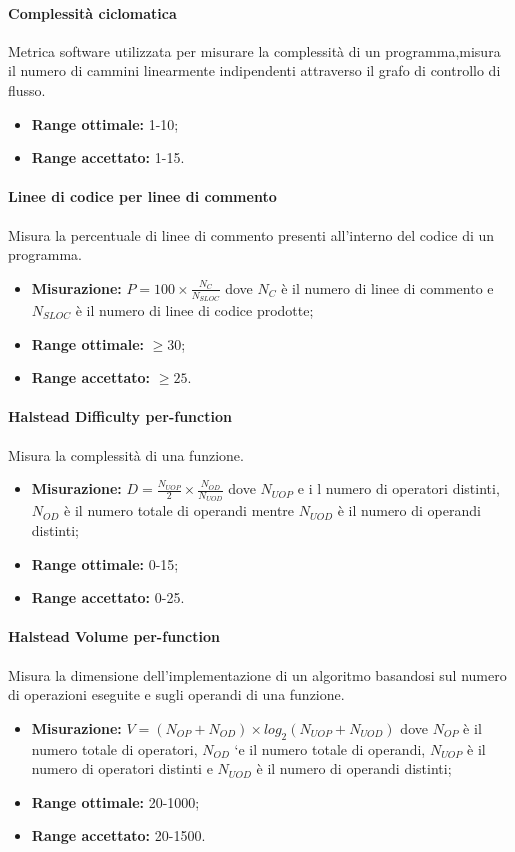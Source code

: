 			\paragraph{Complessità ciclomatica}
			Metrica software utilizzata per misurare la complessità di un programma,misura il numero di cammini linearmente indipendenti attraverso il grafo di controllo di flusso.
			\begin{itemize}
				\item \textbf{Range ottimale:} 1-10;
				\item \textbf{Range accettato:} 1-15.
			\end{itemize}
			\paragraph{Linee di codice per linee di commento}
			Misura la percentuale di linee di commento presenti all'interno del codice di un programma.
			\begin{itemize}
				\item \textbf{Misurazione:} $P=100\times\frac{N_C}{N_{SLOC}}$ dove $N_C$ è il numero di linee di commento e $N_{SLOC}$ è il numero di linee di codice prodotte;
				\item \textbf{Range ottimale:} $\geq30$;
				\item \textbf{Range accettato:} $\geq25$.
			\end{itemize}
			\paragraph{Halstead Difficulty per-function}
			Misura la complessità di una funzione.
			\begin{itemize}
				\item \textbf{Misurazione:} $D=\frac{N_{UOP}}{2}\times\frac{N_{OD}}{N_{UOD}}$ dove $N_{UOP}$ e i l numero di operatori distinti, $N_{OD}$ è il numero totale di operandi mentre $N_{UOD}$ è il numero di operandi distinti;
				\item \textbf{Range ottimale:} 0-15;
				\item \textbf{Range accettato:} 0-25.
			\end{itemize}
			\paragraph{Halstead Volume per-function}
			Misura la dimensione dell'implementazione di un algoritmo basandosi sul numero di operazioni eseguite e sugli operandi di una funzione.
			\begin{itemize}
				\item \textbf{Misurazione:} $V=(N_{OP} + N_{OD})\times log_2(N_{UOP} + N_{UOD})$  dove $N_{OP}$ è il numero totale di operatori, $N_{OD}$ `e il numero totale di operandi, $N_{UOP}$ è
				il numero di operatori distinti e $N_{UOD}$ è il numero di operandi distinti;
			\item \textbf{Range ottimale:} 20-1000;
			\item \textbf{Range accettato:} 20-1500.
			\end{itemize}
